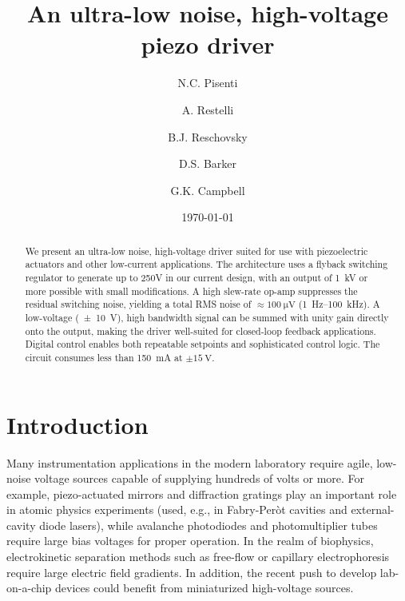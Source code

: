 \documentclass[aip,rsi,reprint]{revtex4-1} %
\begin{document}
\title{An ultra-low noise, high-voltage piezo driver}

\author{N.C. Pisenti}
\author{A. Restelli}
\author{B.J. Reschovsky}
\author{D.S. Barker}
\author{G.K. Campbell}

\date{\today}

\begin{abstract}
We present an ultra-low noise, high-voltage driver suited for use with piezoelectric actuators and other low-current applications. 
The architecture uses a flyback switching regulator to generate up to 250V in our current design, with an output of \SI{1}{\kilo\volt} or more possible with small modifications. 
A high slew-rate op-amp suppresses the residual switching noise, yielding a total RMS noise of $\approx\SI{100}{\micro\volt}$ (\SI{1}{\hertz}--\SI{100}{\kilo\hertz}).
A low-voltage (\SI{\pm 10}{\volt}), high bandwidth signal can be summed with unity gain directly onto the output, making the driver well-suited for closed-loop feedback applications.
Digital control enables both repeatable setpoints and sophisticated control logic. 
The circuit consumes less than \SI{150}{\milli\ampere} at $\pm\SI{15}{\volt}$.
\end{abstract}

\pacs{}%

\maketitle %

\section{Introduction}
\label{Sec:Introduction}

Many instrumentation applications in the modern laboratory require agile, low-noise voltage sources capable of supplying hundreds of volts or more.
For example, piezo-actuated mirrors and diffraction gratings play an important role in atomic physics experiments (used, e.g., in Fabry-Per{\`o}t cavities\cite{Riedle1994a,Bohlouli-Zanjani2006a} and external-cavity diode lasers\cite{Wieman1991a}), while avalanche photodiodes and photomultiplier tubes require large bias voltages for proper operation.
In the realm of biophysics, electrokinetic separation methods such as free-flow or capillary electrophoresis\cite{Kohlheyer2008a} require large electric field gradients.
In addition, the recent push to develop lab-on-a-chip devices could benefit from miniaturized high-voltage sources.\cite{Temiz2015a}
\end{document}
